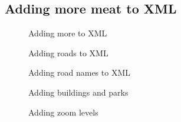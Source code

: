 \documentclass[letterpaper]{article}
\begin{document}
\subsection{Adding more meat to XML}
\label{sec:adding-more-meat}

\begin{figure}[h]
  \centering
  
  \caption{Adding more to XML}
  \label{fig:xml-more}
\end{figure}

\begin{figure}[h]
  \centering
  
  \caption{Adding roads to XML}
  \label{fig:xml-roads}
\end{figure}

\begin{figure}[h]
  \centering
  
  \caption{Adding road names to XML}
  \label{fig:xml-road-names}
\end{figure}

\begin{figure}[h]
  \centering
  
  \caption{Adding buildings and parks}
  \label{fig:xml-polygons}
\end{figure}

\begin{figure}[h]
  \centering
  
  \caption{Adding zoom levels}
  \label{fig:xml-zooms}
\end{figure}





\end{document}
